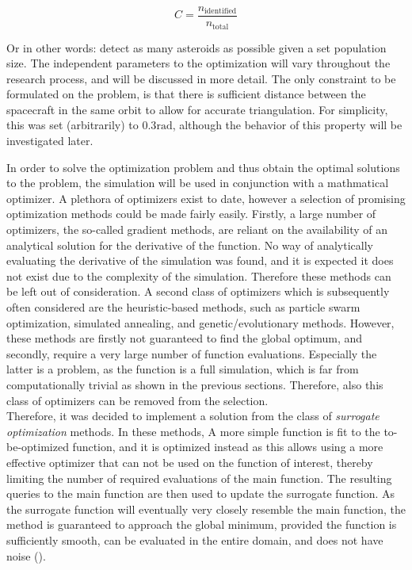 \begin{equation}
 C = \frac{n_{\mathrm{identified}}}{n_{\mathrm{total}}}
\end{equation}

Or in other words: detect as many asteroids as possible given a set population size. The independent parameters to the optimization will vary throughout the research process, and will be discussed in more detail. The only constraint to be formulated on the problem, is that there is sufficient distance between the spacecraft in the same orbit to allow for accurate triangulation. For simplicity, this was set (arbitrarily) to $0.3\mathrm{rad}$, although the behavior of this property will be investigated later.

In order to solve the optimization problem and thus obtain the optimal solutions to the problem, the simulation will be used in conjunction with a mathmatical optimizer. A plethora of optimizers exist to date, however a selection of promising optimization methods could be made fairly easily. Firstly, a large number of optimizers, the so-called gradient methods, are reliant on the availability of an analytical solution for the derivative of the function. No way of analytically evaluating the derivative of the simulation was found, and it is expected it does not exist due to the complexity of the simulation. Therefore these methods can be left out of consideration. A second class of optimizers which is subsequently often considered are the heuristic-based methods, such as particle swarm optimization, simulated annealing, and genetic/evolutionary methods. However, these methods are firstly not guaranteed to find the global optimum, and secondly, require a very large number of function evaluations. Especially the latter is a problem, as the function is a full simulation, which is far from computationally trivial as shown in the previous sections. Therefore, also this class of optimizers can be removed from the selection. \\

Therefore, it was decided to implement a solution from the class of \textit{surrogate optimization} methods. In these methods, A more simple function is fit to the to-be-optimized function, and it is optimized instead as this allows using a more effective optimizer that can not be used on the function of interest, thereby limiting the number of required evaluations of the main function. The resulting queries to the main function are then used to update the surrogate function. As the surrogate function will eventually very closely resemble the main function, the method is guaranteed to approach the global minimum, provided the function is sufficiently smooth, can be evaluated in the entire domain, and does not have noise (\cite{Surrogate}). \\

